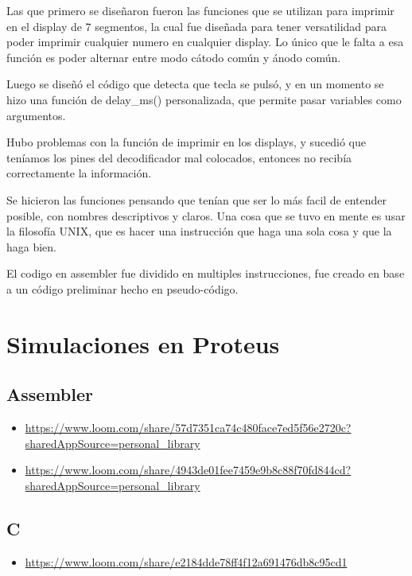 \documentclass{article}
\begin{document}
	Las que primero se diseñaron fueron las funciones que se utilizan para imprimir en el
	display de 7 segmentos, la cual fue diseñada para tener versatilidad para poder
	imprimir cualquier numero en cualquier display. Lo único que le falta a esa función es
	poder alternar entre modo cátodo común y ánodo común.
	
	Luego se diseñó el código que detecta que tecla se pulsó, y en un momento se hizo
	una función de delay\_ms() personalizada, que permite pasar variables como argumentos.

	Hubo problemas con la función de imprimir en los displays, y sucedió que teníamos los
	pines del decodificador mal colocados, entonces no recibía correctamente la información.

	Se hicieron las funciones pensando que tenían que ser lo más facil de entender posible,
	con nombres descriptivos y claros.
	Una cosa que se tuvo en mente es usar la filosofía UNIX, que es hacer una
	instrucción que haga una sola cosa y que la haga bien.

	El codigo en assembler fue dividido en multiples instrucciones, fue creado en base a un
	código preliminar hecho en pseudo-código.

\section{Simulaciones en Proteus}

	\subsection{ Assembler}
	\begin{itemize}
		\item \url{https://www.loom.com/share/57d7351ca74c480face7ed5f56e2720c?sharedAppSource=personal_library}\\
		\item \url{https://www.loom.com/share/4943de01fee7459e9b8c88f70fd844cd?sharedAppSource=personal_library}
	\end{itemize}

	\subsection{C}
	\begin{itemize}
		\item \url{ https://www.loom.com/share/e2184dde78ff4f12a691476db8c95cd1}
	\end{itemize}
\end{document}
